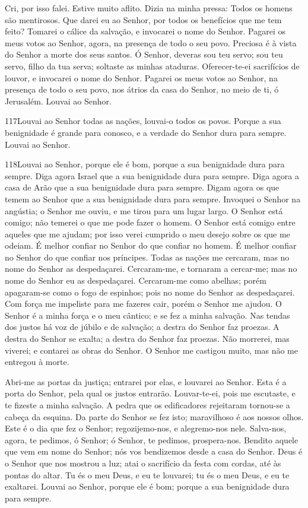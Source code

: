 Cri, por isso falei. Estive muito aflito. Dizia na minha
pressa: Todos os homens são mentirosos. Que darei eu ao
Senhor, por todos os benefícios que me tem feito? Tomarei o
cálice da salvação, e invocarei o nome do Senhor. Pagarei os
meus votos ao Senhor, agora, na presença de todo o seu povo.
Preciosa é à vista do Senhor a morte dos seus santos.
Ó Senhor, deveras sou teu servo; sou teu servo, filho da tua
serva; soltaste as minhas ataduras.
 Oferecer-te-ei sacrifícios de louvor, e invocarei o nome do
Senhor. Pagarei os meus votos ao Senhor, na presença de todo
o seu povo, nos átrios da casa do Senhor, no meio de ti, ó
Jerusalém. Louvai ao Senhor.

\bigskip

\lettrine{117}{}Louvai ao Senhor todas as nações, louvai-o
todos os povos. Porque a sua benignidade é grande para conosco,
e a verdade do Senhor dura para sempre. Louvai ao Senhor.

\bigskip

\lettrine{118}{}Louvai ao Senhor, porque ele é bom, porque a
sua benignidade dura para sempre. Diga agora Israel que a sua
benignidade dura para sempre. Diga agora a casa de Arão que a
sua benignidade dura para sempre. Digam agora os que temem ao
Senhor que a sua benignidade dura para sempre. Invoquei o Senhor
na angústia; o Senhor me ouviu, e me tirou para um lugar largo.
O Senhor está comigo; não temerei o que me pode fazer o homem.
O Senhor está comigo entre aqueles que me ajudam; por isso verei
cumprido o meu desejo sobre os que me odeiam. É melhor confiar
no Senhor do que confiar no homem. É melhor confiar no Senhor do
que confiar nos príncipes. Todas as nações me cercaram, mas
no nome do Senhor as despedaçarei. Cercaram-me, e tornaram a
cercar-me; mas no nome do Senhor eu as despedaçarei.
Cercaram-me como abelhas; porém apagaram-se como o fogo de
espinhos; pois no nome do Senhor as despedaçarei. Com força
me impeliste para me fazeres cair, porém o Senhor me ajudou.
O Senhor é a minha força e o meu cântico; e se fez a minha
salvação. Nas tendas dos justos há voz de júbilo e de
salvação; a destra do Senhor faz proezas. A destra do Senhor
se exalta; a destra do Senhor faz proezas. Não morrerei, mas
viverei; e contarei as obras do Senhor. O Senhor me castigou
muito, mas não me entregou à morte.

Abri-me as portas da justiça; entrarei por elas, e louvarei ao
Senhor. Esta é a porta do Senhor, pela qual os justos
entrarão. Louvar-te-ei, pois me escutaste, e te fizeste a
minha salvação. A pedra que os edificadores rejeitaram
tornou-se a cabeça da esquina. Da parte do Senhor se fez
isto; maravilhoso é aos nossos olhos. Este é o dia que fez o
Senhor; regozijemo-nos, e alegremo-nos nele. Salva-nos,
agora, te pedimos, ó Senhor; ó Senhor, te pedimos, prospera-nos.
Bendito aquele que vem em nome do Senhor; nós vos bendizemos
desde a casa do Senhor. Deus é o Senhor que nos mostrou a
luz; atai o sacrifício da festa com cordas, até às pontas do altar.
Tu és o meu Deus, e eu te louvarei; tu és o meu Deus, e eu te
exaltarei. Louvai ao Senhor, porque ele é bom; porque a sua
benignidade dura para sempre.

